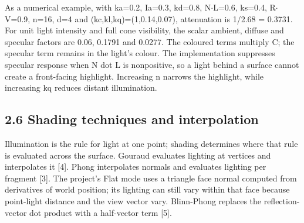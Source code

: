 \documentclass[12pt,a4paper]{article}
\begin{document}
As a numerical example, with ka=0.2, Ia=0.3, kd=0.8, N\(\cdot\)L=0.6, ks=0.4, R\(\cdot\)V=0.9, n=16, d=4 and (kc,kl,kq)=(1,0.14,0.07), attenuation is 1/2.68 = 0.3731. For unit light intensity and full cone visibility, the scalar ambient, diffuse and specular factors are 0.06, 0.1791 and 0.0277. The coloured terms multiply C; the specular term remains in the light's colour. The implementation suppresses specular response when N dot L is nonpositive, so a light behind a surface cannot create a front-facing highlight. Increasing n narrows the highlight, while increasing kq reduces distant illumination.

\subsection*{2.6 Shading techniques and interpolation}
Illumination is the rule for light at one point; shading determines where that rule is evaluated across the surface. Gouraud evaluates lighting at vertices and interpolates it [4]. Phong interpolates normals and evaluates lighting per fragment [3]. The project's Flat mode uses a triangle face normal computed from derivatives of world position; its lighting can still vary within that face because point-light distance and the view vector vary. Blinn-Phong replaces the reflection-vector dot product with a half-vector term [5].
\end{document}
